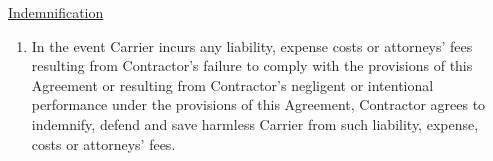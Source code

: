 \underline{Indemnification}
\begin{enumerate}
    \item In the event Carrier incurs any liability, expense costs or
    attorneys' fees resulting from Contractor's failure to comply with the
    provisions of this Agreement or resulting from Contractor's negligent
    or intentional performance under the provisions of this Agreement,
    Contractor agrees to indemnify, defend and save harmless Carrier from
    such liability, expense, costs or attorneys' fees.
\end{enumerate}
